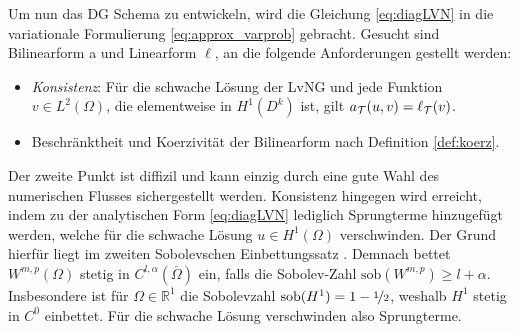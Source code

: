 Um nun das DG Schema zu entwickeln, wird die Gleichung \eqref{eq:diagLVN} in die variationale Formulierung \eqref{eq:approx_varprob} gebracht. Gesucht sind Bilinearform a und Linearform $\ell$, an die folgende Anforderungen gestellt werden:
\begin{itemize}
  \item \emph{Konsistenz}: Für die schwache Lösung der LvNG und jede Funktion $v\in L^2(\Omega)$, die elementweise in $H^1(D^k)$ ist, gilt ${a_{\mathcal{T}}(u,v)=\ell_{\mathcal{T}}(v)}$.
  \item Beschränktheit und Koerzivität der Bilinearform nach Definition \ref{def:koerz}.
\end{itemize}
Der zweite Punkt ist diffizil und kann einzig durch eine gute Wahl des numerischen Flusses sichergestellt werden.
Konsistenz hingegen wird erreicht, indem zu der analytischen Form \eqref{eq:diagLVN} lediglich Sprungterme hinzugefügt werden, welche für die schwache Lösung $u\in H^1(\Omega)$ verschwinden. Der Grund hierfür liegt im zweiten Sobolevschen Einbettungssatz \cite{buchPietro}. Demnach bettet $W^{m,p}(\Omega)$ stetig in $C^{l,\alpha}(\overline{\Omega})$ ein, falls die Sobolev-Zahl ${\text{sob}(W^{m,p})\geq l+\alpha}$.
Insbesondere ist für $\Omega\in\mathbb{R}^1$ die Sobolevzahl $\text{sob}(H^1) = 1-\nicefrac{1}{2}$, weshalb $H^1$ stetig in $C^0$ einbettet. Für die schwache Lösung verschwinden also Sprungterme.

